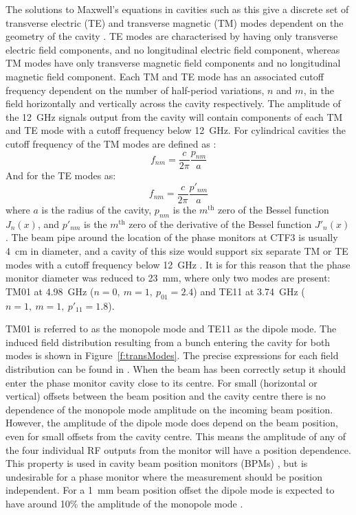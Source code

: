 The solutions to Maxwell's equations in cavities such as this give a discrete set of transverse electric (TE) and transverse magnetic (TM) modes dependent on the geometry of the cavity \cite{collinsWvGd}. TE modes are characterised by having only transverse electric field components, and no longitudinal electric field component, whereas TM modes have only transverse magnetic field components and no longitudinal magnetic field component. Each TM and TE mode has an associated cutoff frequency dependent on the number of half-period variations, \(n\) and \(m\), in the field horizontally and vertically across the cavity respectively. The amplitude of the 12~GHz signals output from the cavity will contain components of each TM and TE mode with a cutoff frequency below 12~GHz. For cylindrical cavities the cutoff frequency of the TM modes are defined as \cite{collinsWvGd}:
\begin{equation}
f_{nm} = \frac{c}{2\pi}\frac{p_{nm}}{a} 
\end{equation}
And for the TE modes as:
\begin{equation}
f_{nm} = \frac{c}{2\pi}\frac{p'_{nm}}{a} 
\end{equation}
where \(a\) is the radius of the cavity, \(p_{nm}\) is the \(m^\mathrm{th}\) zero of the Bessel function \(J_n(x)\), and \(p'_{nm}\) is the \(m^\mathrm{th}\) zero of the derivative of the Bessel function \(J'_n(x)\) \cite{kreyszig}. The beam pipe around the location of the phase monitors at CTF3 is usually 4~cm in diameter, and a cavity of this size would support six separate TM or TE modes with a cutoff frequency below 12~GHz \cite{phMonIPAC10}. It is for this reason that the phase monitor diameter was reduced to 23~mm, where only two modes are present: TM01 at 4.98~GHz (\(n=0,~m=1,~p_{01}=2.4\)) and TE11 at 3.74~GHz (\(n=1,~m=1,~p'_{11}=1.8\)).

TM01 is referred to as the monopole mode and TE11 as the dipole mode. The induced field distribution resulting from a bunch entering the cavity for both modes is shown in Figure~\ref{f:transModes}. The precise expressions for each field distribution can be found in \cite{lipka}. When the beam has been correctly setup it should enter the phase monitor cavity close to its centre. 
For small (horizontal or vertical) offsets between the beam position and the cavity centre there is no dependence of the monopole mode amplitude on the incoming beam position. However, the amplitude of the dipole mode does depend on the beam position, even for small offsets from the cavity centre. 
This means the amplitude of any of the four individual RF outputs from the monitor will have a position dependence. This property is used in cavity beam position monitors (BPMs) \cite{lipka}, but is undesirable for a phase monitor where the measurement should be position independent. For a 1~mm beam position offset the dipole mode is expected to have around 10\% the amplitude of the monopole mode \cite{alexCWS13}.

